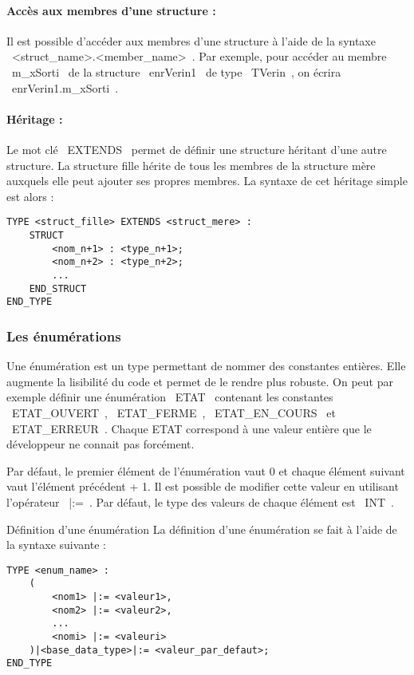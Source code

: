 \paragraph{Accès aux membres d'une structure : }
Il est possible d'accéder aux membres d'une structure à l'aide de la syntaxe ~<struct_name>.<member_name>~. Par exemple, pour accéder au membre ~m_xSorti~ de la structure ~enrVerin1~ de type ~TVerin~, on écrira ~enrVerin1.m_xSorti~.


\paragraph{Héritage : }
Le mot clé ~EXTENDS~ permet de définir une structure héritant d'une autre structure. La structure fille hérite de tous les membres de la structure mère auxquels elle peut ajouter ses propres membres. La syntaxe de cet héritage simple est alors : 

\begin{lstlisting}[language=ST]
TYPE <struct_fille> EXTENDS <struct_mere> :
    STRUCT
        <nom_n+1> : <type_n+1>;
        <nom_n+2> : <type_n+2>;
        ...
    END_STRUCT
END_TYPE\end{lstlisting}

\subsubsection{Les énumérations}
Une énumération est un type permettant de nommer des constantes entières. Elle augmente la lisibilité du code et permet de le rendre plus robuste. On peut par exemple définir une énumération ~ETAT~ contenant les constantes ~ETAT\_OUVERT~, ~ETAT\_FERME~, ~ETAT\_EN\_COURS~ et ~ETAT\_ERREUR~. Chaque ETAT correspond à une valeur entière que le développeur ne connait pas forcément. 

Par défaut, le premier élément de l'énumération vaut 0 et chaque élément suivant vaut l'élément précédent + 1. Il est possible de modifier cette valeur en utilisant l'opérateur ~|:=~. Par défaut, le type des valeurs de chaque élément est ~INT~. 

\begin{UPSTIinfor}{Définition d'une énumération}
    La définition d'une énumération se fait à l'aide de la syntaxe suivante : 
    \begin{lstlisting}[language=ST]
TYPE <enum_name> :
    (
        <nom1> |:= <valeur1>,
        <nom2> |:= <valeur2>,
        ...
        <nomi> |:= <valeuri>
    )|<base_data_type>|:= <valeur_par_defaut>;
END_TYPE\end{lstlisting}
\end{UPSTIinfor}

